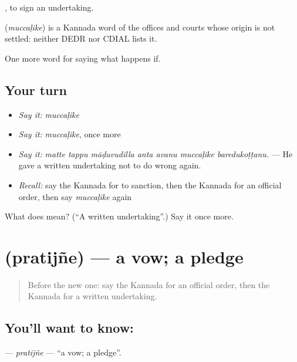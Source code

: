  , to sign an undertaking.

\begin{cousinweb}
\textbf{} (\emph{muccaḷike}) is a Kannada word of the offices and courts whose origin is not settled: neither DEDR nor CDIAL lists it.
\end{cousinweb}

\begin{grammarlens}[title={What you've built}]
One more word for saying what happens if.
\end{grammarlens}

\subsection*{Your turn}
\begin{itemize}
\raggedright
  \item \emph{Say it:} \emph{muccaḷike}
  \item \emph{Say it:} \emph{muccaḷike}, once more
  \item \emph{Say it:} \emph{matte tappu māḍuvudilla anta avanu muccaḷike baredukoṭṭanu.} — He gave a written undertaking not to do wrong again.
  \item \emph{Recall:} say the Kannada for to sanction, then the Kannada for an official order, then say \emph{muccaḷike} again
\end{itemize}

\begin{tcolorbox}[breakable,colback=teal!4,colframe=teal!35!black,title={Before you move on}]
What does  mean? (\textquotedblleft{}A written undertaking\textquotedblright{}.) Say it once more.
\end{tcolorbox}
\section[\texorpdfstring{\kn{ಪ್ರತಿಜ್ಞೆ} (pratijñe)}{ಪ್ರತಿಜ್ಞೆ (pratijñe)}]{ (pratijñe) — a vow; a pledge}

\label{lesson:KA-C416-pratijne}



\begin{quote}
Before the new one: say the Kannada for an official order, then the Kannada for a written undertaking.
\end{quote}

\subsection*{You'll want to know: }
\textbf{} — \emph{pratijñe} — \textquotedblleft{}a vow; a pledge\textquotedblright{}.

